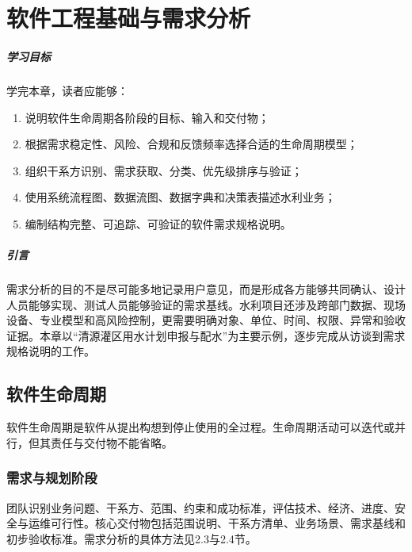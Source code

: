 \chapter{软件工程基础与需求分析}

\paragraph*{学习目标}

学完本章，读者应能够：

\begin{enumerate}
\item 说明软件生命周期各阶段的目标、输入和交付物；
\item 根据需求稳定性、风险、合规和反馈频率选择合适的生命周期模型；
\item 组织干系方识别、需求获取、分类、优先级排序与验证；
\item 使用系统流程图、数据流图、数据字典和决策表描述水利业务；
\item 编制结构完整、可追踪、可验证的软件需求规格说明。
\end{enumerate}

\paragraph*{引言}

需求分析的目的不是尽可能多地记录用户意见，而是形成各方能够共同确认、设计人员能够实现、测试人员能够验证的需求基线。水利项目还涉及跨部门数据、现场设备、专业模型和高风险控制，更需要明确对象、单位、时间、权限、异常和验收证据。本章以“清源灌区用水计划申报与配水”为主要示例，逐步完成从访谈到需求规格说明的工作。

\section{软件生命周期}

软件生命周期是软件从提出构想到停止使用的全过程\cite{ISO12207,IEEE1074,sommerville2015,bourque2014,zhang2013}。生命周期活动可以迭代或并行，但其责任与交付物不能省略。

\subsection{需求与规划阶段}

团队识别业务问题、干系方、范围、约束和成功标准，评估技术、经济、进度、安全与运维可行性。核心交付物包括范围说明、干系方清单、业务场景、需求基线和初步验收标准。需求分析的具体方法见2.3与2.4节。

